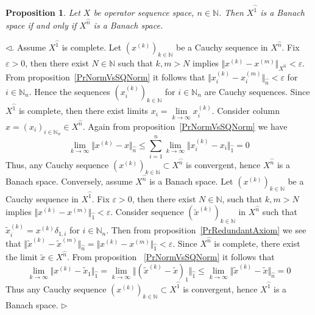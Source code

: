 \documentclass[12pt]{article}
\newtheorem{proposition}[theorem]{Proposition}
\newenvironment{proof}{\par $\triangleleft$}{$\triangleright$}
\begin{document}
\begin{proposition}\label{PrSQSpaceComplSoAmplISCompl}
Let $X$ be operator sequence space, $n\in\mathbb{N}$. Then $X^{\wideparen{1}}$ 
is a Banach space  if and only if  $X^{\wideparen{n}}$ is a Banach space.
\end{proposition}
\begin{proof}. Assume $X^{\wideparen{1}}$ is complete. Let 
${(x^{(k)})}_{k\in\mathbb{N}}$ be a Cauchy sequence in $X^{\wideparen{n}}$. 
Fix $\varepsilon>0$, then there exist $N\in\mathbb{N}$ such that $k,m> N$ 
implies $\Vert x^{(k)}-x^{(m)}\Vert_{X^{\wideparen{n}}}<\varepsilon$. From 
proposition~\ref{PrNormVsSQNorm} it follows that 
$\Vert x_i^{(k)}-x_i^{(m)}\Vert_{\wideparen{n}}<\varepsilon$ for 
$i\in\mathbb{N}_n$. Hence the sequences 
${(x_i^{(k)})}_{k\in\mathbb{N}}$ for $i\in\mathbb{N}_n$ are Cauchy sequences. 
Since $X^{\wideparen{1}}$ is complete, then there exist limits 
$x_i=\lim\limits_{k\to\infty}x_i^{(k)}$. Consider column 
$x={(x_i)}_{i\in\mathbb{N}_n}\in  X^{\wideparen{n}}$. 
Again from proposition~\ref{PrNormVsSQNorm} we have
$$
\lim_{k\to\infty}\Vert
x^{(k)}-x\Vert_{\wideparen{n}}
\leq\sum\limits_{i=1}^n\lim\limits_{k\to\infty}\Vert 
    x_i^{(k)}-x_i\Vert_{\wideparen{1}}
=0
$$
Thus, any Cauchy sequence 
${(x^{(k)})}_{k\in\mathbb{N}}\subset X^{\wideparen{n}}$ 
is convergent, hence $X^{\wideparen{n}}$ is a Banach space. Conversely, 
assume $X^{\wideparen{n}}$ is a Banach space. Let ${(x^{(k)})}_{k\in\mathbb{N}}$ 
be a Cauchy sequence in $X^{\wideparen{1}}$. Fix $\varepsilon>0$, then there 
exist $N\in\mathbb{N}$, such that $k,m> N$ implies 
$\Vert x^{(k)}-x^{(m)}\Vert_{\wideparen{1}}<\varepsilon$.  Consider sequence 
${(\tilde{x}^{(k)})}_{k\in\mathbb{N}}$ in $X^{\wideparen{n}}$ such that 
$\tilde{x}_i^{(k)}=x^{(k)}\delta_{1,i}$ for $i\in\mathbb{N}_n$. Then from 
proposition~\ref{PrRedundantAxiom} we see that 
$\Vert \tilde{x}^{(k)}-\tilde{x}^{(m)}\Vert_{\wideparen{n}}
=\Vert x^{(k)}-x^{(m)}\Vert_{\wideparen{1}}<\varepsilon$. Since 
$X^{\wideparen{n}}$ is complete, there exist the limit 
$\tilde{x}\in X^{\wideparen{n}}$. From proposition 
~\ref{PrNormVsSQNorm} it follows that
$$
\lim\limits_{k\to\infty}\Vert x^{(k)}-\tilde{x}_1\Vert_{\wideparen{1}}
=\lim\limits_{k\to\infty}\Vert
    {(\tilde{x}^{(k)}-\tilde{x})}_1
\Vert_{\wideparen{1}}
\leq\lim\limits_{k\to\infty}\Vert
\tilde{x}^{(k)}-\tilde{x}\Vert_{\wideparen{n}}=0
$$
Thus any Cauchy sequence ${(x^{(k)})}_{k\in\mathbb{N}}\subset X^{\wideparen{1}}$ 
is convergent, hence $X^{\wideparen{1}}$ is a Banach space. 
\end{proof}
\end{document}
